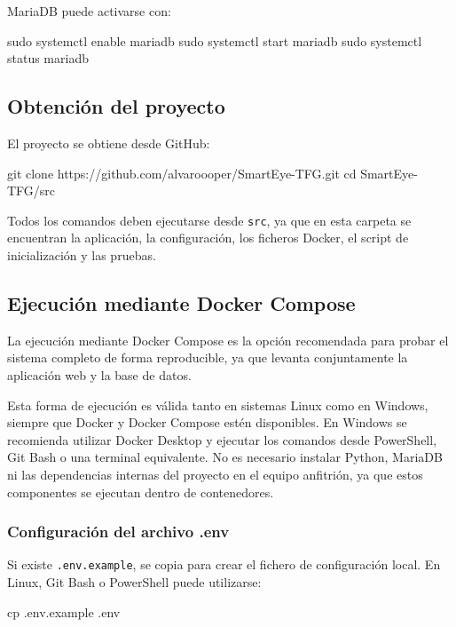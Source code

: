 MariaDB puede activarse con:

\begin{bloqueTerminal}[title={Activación de MariaDB}]
	sudo systemctl enable mariadb
	sudo systemctl start mariadb
	sudo systemctl status mariadb
\end{bloqueTerminal}

\subsection{Obtención del proyecto}

El proyecto se obtiene desde GitHub:

\begin{bloqueTerminal}[title={Clonado del repositorio}]
	git clone https://github.com/alvaroooper/SmartEye-TFG.git
	cd SmartEye-TFG/src
\end{bloqueTerminal}

Todos los comandos deben ejecutarse desde \texttt{src}, ya que en esta carpeta se encuentran la aplicación, la configuración, los ficheros Docker, el script de inicialización y las pruebas.

\subsection{Ejecución mediante Docker Compose}

La ejecución mediante Docker Compose es la opción recomendada para probar el sistema completo de forma reproducible, ya que levanta conjuntamente la aplicación web y la base de datos.

Esta forma de ejecución es válida tanto en sistemas Linux como en Windows, siempre que Docker y Docker Compose estén disponibles. En Windows se recomienda utilizar Docker Desktop y ejecutar los comandos desde PowerShell, Git Bash o una terminal equivalente. No es necesario instalar Python, MariaDB ni las dependencias internas del proyecto en el equipo anfitrión, ya que estos componentes se ejecutan dentro de contenedores.

\subsubsection{Configuración del archivo .env}

Si existe \texttt{.env.example}, se copia para crear el fichero de configuración local. En Linux, Git Bash o PowerShell puede utilizarse:

\begin{bloqueTerminal}[title={Creación del fichero de entorno}]
	cp .env.example .env
\end{bloqueTerminal}

